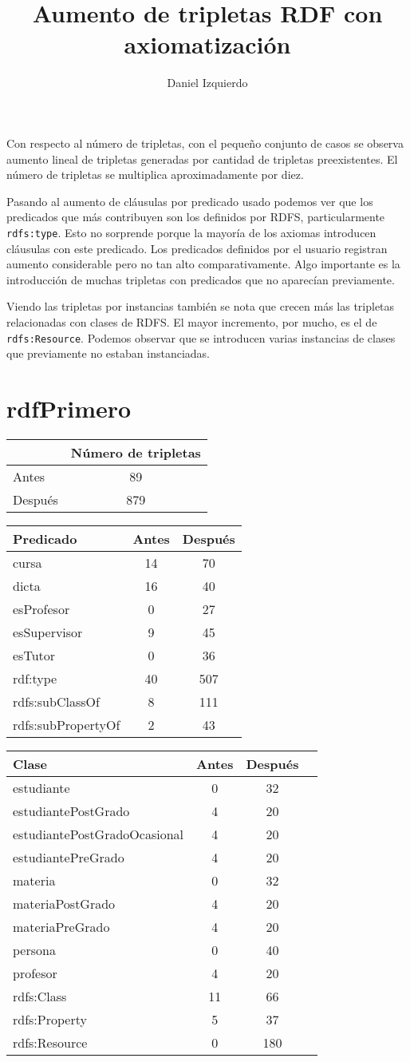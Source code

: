 \documentclass{article}
\newcommand{\tablaTripletas}[2]
{
\begin{tabular}{l|c}
 & Número de tripletas \\
 \hline
 Antes & #1 \\
 Después & #2 \\
\end{tabular}
}
\newcommand{\tablaPredicados}[1]
{
\begin{tabular}{l|c|c}
Predicado & Antes & Después \\
\hline
#1
\end{tabular}
}
\newcommand{\tablaInstancias}[1]
{
\begin{tabular}{l|c|c|c}
Clase & Antes & Después \\
\hline
#1
\end{tabular}
}
\newcommand{\resultadoDataSet}[5]
{
  \newpage

  \section{#1}

  \vspace{0.5cm}

  \tablaTripletas{#2}{#3}

  \vspace{1cm}

  \tablaPredicados{#4}

  \vspace{1cm}

  \tablaInstancias{#5}
}
\begin{document}
\title{Aumento de tripletas RDF con axiomatización}
\date{}
\author{Daniel Izquierdo}

\maketitle


Con respecto al número de tripletas, con el pequeño conjunto de casos se observa
aumento lineal de tripletas generadas por cantidad de tripletas preexistentes.
El número de tripletas se multiplica aproximadamente por diez.

Pasando al aumento de cláusulas por predicado usado podemos ver que los
predicados que más contribuyen son los definidos por RDFS, particularmente
{\tt rdfs:type}. Esto no sorprende porque la mayoría de los axiomas introducen
cláusulas con este predicado. Los predicados definidos por el usuario registran
aumento considerable pero no tan alto comparativamente. Algo importante es la
introducción de muchas tripletas con predicados que no aparecían previamente.

Viendo las tripletas por instancias también se nota que crecen más las tripletas
relacionadas con clases de RDFS. El mayor incremento, por mucho, es el de {\tt
rdfs:Resource}. Podemos observar que se introducen varias instancias de clases
que previamente no estaban instanciadas.



\resultadoDataSet{rdfPrimero}{89}{879}
{
    cursa & 14 & 70 \\
    dicta & 16 & 40 \\
    esProfesor & 0 & 27 \\
    esSupervisor & 9 & 45 \\
    esTutor & 0 & 36 \\
    rdf:type & 40 & 507 \\
    rdfs:subClassOf & 8 & 111 \\
    rdfs:subPropertyOf & 2 & 43 \\
}
{
    estudiante & 0 & 32 \\
    estudiantePostGrado & 4 & 20 \\
    estudiantePostGradoOcasional & 4 & 20 \\
    estudiantePreGrado & 4 & 20 \\
    materia & 0 & 32 \\
    materiaPostGrado & 4 & 20 \\
    materiaPreGrado & 4 & 20 \\
    persona & 0 & 40 \\
    profesor & 4 & 20 \\
    rdfs:Class & 11 & 66 \\
    rdfs:Property & 5 & 37 \\
    rdfs:Resource & 0 & 180 \\
}
\end{document}
